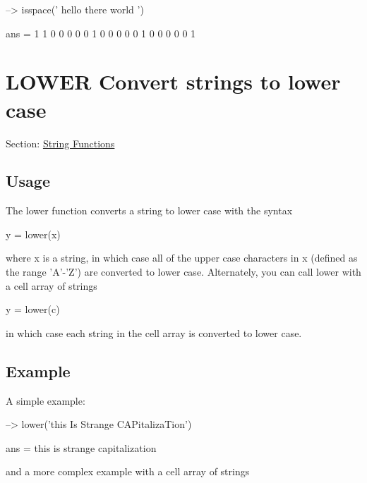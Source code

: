 \begin{DoxyVerbInclude}
--> isspace('  hello there world ')

ans = 
 1 1 0 0 0 0 0 1 0 0 0 0 0 1 0 0 0 0 0 1 
\end{DoxyVerbInclude}
 \hypertarget{string_lower}{}\section{L\-O\-W\-E\-R Convert strings to lower case}\label{string_lower}
Section\-: \hyperlink{sec_string}{String Functions} \hypertarget{vtkwidgets_vtkxyplotwidget_Usage}{}\subsection{Usage}\label{vtkwidgets_vtkxyplotwidget_Usage}
The {\ttfamily lower} function converts a string to lower case with the syntax \begin{DoxyVerb}   y = lower(x)
\end{DoxyVerb}
 where {\ttfamily x} is a string, in which case all of the upper case characters in {\ttfamily x} (defined as the range {\ttfamily 'A'-\/'Z'}) are converted to lower case. Alternately, you can call {\ttfamily lower} with a cell array of strings \begin{DoxyVerb}   y = lower(c)
\end{DoxyVerb}
 in which case each string in the cell array is converted to lower case. \hypertarget{variables_struct_Example}{}\subsection{Example}\label{variables_struct_Example}
A simple example\-:


\begin{DoxyVerbInclude}
--> lower('this Is Strange CAPitalizaTion')

ans = 
this is strange capitalization
\end{DoxyVerbInclude}


and a more complex example with a cell array of strings



